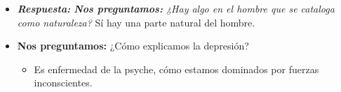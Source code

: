 \begin{itemize}
    \item \emph{\textbf{Respuesta:} \textbf{Nos preguntamos:} ¿Hay algo en el hombre que se cataloga como naturaleza?} Sí hay una parte natural del hombre.
    \item \textbf{Nos preguntamos:} ¿Cómo explicamos la depresión?  
        \begin{itemize}
            \item Es enfermedad de la psyche, cómo estamos dominados por fuerzas inconscientes.
        \end{itemize}
\end{itemize}


